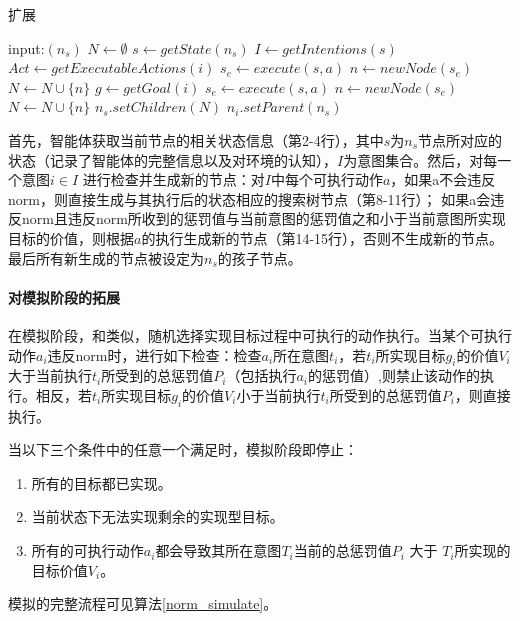 \begin{algorithm}
\caption{扩展}\label{norm_expand}
\begin{algorithmic}[1]
\STATE input:$(n_s)$
      \STATE $N \gets \emptyset$
      \STATE $s \gets getState(n_s)$
      \STATE $I \gets getIntentions(s)$
        \STATE $Act \gets getExecutableActions(i)$
            \STATE $s_e \gets execute(s, a)$
            \STATE $n \gets newNode(s_e)$
            \STATE $N \gets N \cup \{n\}$
            \STATE $g \gets getGoal(i)$
            \STATE $s_e \gets execute(s, a)$
            \STATE $n \gets newNode(s_e)$
            \STATE $N \gets N \cup \{n\}$
          \ENDIF
        \ENDFOR
      \ENDFOR
    \STATE $n_s.setChildren(N)$
    \STATE $n_i.setParent(n_s)$
    \ENDFOR
\end{algorithmic}
\end{algorithm}
%
首先，智能体获取当前节点的相关状态信息（第2-4行），其中$s$为$n_s$节点所对应的状态（记录了智能体的完整信息以及对环境的认知），$I$为意图集合。然后，对每一个意图$i \in  I$ 进行检查并生成新的节点：对$I$中每个可执行动作$a$，如果a不会违反norm，则直接生成与其执行后的状态相应的搜索树节点（第8-11行）； 如果a会违反norm且违反norm所收到的惩罚值与当前意图的惩罚值之和小于当前意图所实现目标的价值，则根据$a$的执行生成新的节点（第14-15行），否则不生成新的节点。 最后所有新生成的节点被设定为$n_s$的孩子节点。

\paragraph{对模拟阶段的拓展}
在模拟阶段，\SAN 和\SA 类似，随机选择实现目标过程中可执行的动作执行。当某个可执行动作$a_i$违反norm时，进行如下检查：检查$a_i$所在意图$t_i$，若$t_i$所实现目标$g_i$的价值$V_i$大于当前执行$t_i$所受到的总惩罚值$P_i$（包括执行$a_i$的惩罚值）,则禁止该动作的执行。相反，若$t_i$所实现目标$g_i$的价值$V_i$小于当前执行$t_i$所受到的总惩罚值$P_i$，则直接执行。

当以下三个条件中的任意一个满足时，模拟阶段即停止：
\begin{enumerate}
  \item 所有的目标都已实现。
  \item 当前状态下无法实现剩余的实现型目标。
  \item 所有的可执行动作$a_i$都会导致其所在意图$T_i$当前的总惩罚值$P_i$ 大于 $T_i$所实现的目标价值$V_i$。
\end{enumerate}
模拟的完整流程可见算法\ref{norm_simulate}。

